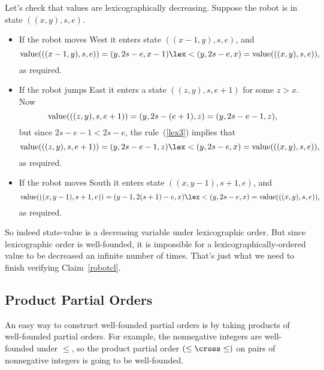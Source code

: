 Let's check that values are lexicographically decreasing.  Suppose the
robot is in state $((x,y),s,e)$.
\begin{itemize}
\item If the robot moves West it enters state $((x-1,y),s,e)$, and
\[
\vl(((x-1,y),s,e)) = (y,2s-e,x-1) \lex< (y,2s-e,x) = \vl(((x,y),s,e)),
\]
as required.


\item If the robot jumps East it enters a state $((z,y),s,e+1)$ for some
$z>x$.  Now
\[
\text{value}(((z,y),s,e+1)) = (y,2s-(e+1),z) = (y,2s-e-1,z),
\]
but since $2s-e-1 < 2s-e$, the rule~(\ref{lex3}) implies that
\[
\vl(((z,y),s,e+1)) = (y,2s-e-1,z)  \lex< (y,2s-e,x) = \vl(((x,y),s,e)),
\]
as required.

\item If the robot moves South it enters state $((x,y-1),s+1,e)$, and
\[
\vl(((x,y-1),s+1,e)) = (y-1,2(s+1)-e,x) \lex< (y,2s-e,x) = \vl(((x,y),s,e)),
\]
as required.

\end{itemize}

So indeed state-value is a decreasing variable under lexicographic order.
But since lexicographic order is well-founded, it is impossible for a
lexicographically-ordered value to be decreased an infinite number of
times.  That's just what we need to finish verifying Claim~\ref{robotcl}.

\iffalse
Now notice that the lexicographic order on $\naturals^3$ defined in the
previous section (by the condition~(\ref{lex3})) is exactly the same as
$\lexle$ on $\naturals^3$ according to Definition~\ref{lexn}.

But we already proved that the value of the robot's state decreases at
every step.  And we have just proved that the order on these values is
well-founded.  So Lemma~\ref{d-chain} implies that the values cannot keep
decreasing forever.  That means the robot cannot keep moving forever: it
must always terminate.
\fi



\subsection{Product Partial Orders}

An easy way to construct well-founded partial orders is by taking products
of well-founded partial orders.  For example, the nonnegative integers are
well-founded under $\leq$, so the product partial order $(\leq \cross
\leq)$ on pairs of nonnegative integers is going to be well-founded.

